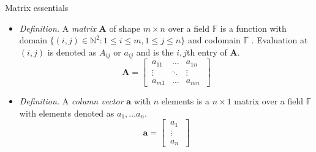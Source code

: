 \documentclass{beamer}
\numberwithin{equation}{section}
\begin{document}
\begin{frame}{Matrix essentials}
    \begin{itemize}
        \item
        \textit{Definition.} A \textit{matrix} $ \mathbf{A} $ of shape
        $ m \times n $ over a field\footnotemark{} $ \mathbb{F} $ is a function with domain $ \{(i, j) \in \mathbb{N}^2
        : 1 \le i \le m, 1 \le j \le n\} $ and codomain $ \mathbb{F} $
        \cite{jacob_linalg}. Evaluation at $ (i, j) $ is denoted as $ A_{ij} $
        or $ a_{ij} $ and is the $ i, j $th entry of $ \mathbf{A} $.
        \begin{equation*}
            \mathbf{A} = \begin{bmatrix}
                \ a_{11} & \ldots & a_{1n} \ \\
                \ \vdots & \ddots & \vdots \ \\
                \ a_{m1} & \ldots & a_{mn} \
            \end{bmatrix}
        \end{equation*}

        \item
        \textit{Definition.} A \textit{column vector} $ \mathbf{a} $ with
        $ n $ elements is a $ n \times 1 $ matrix over a field $ \mathbb{F} $
        with elements denoted as $ a_1, \ldots a_n $.
        \begin{equation*}
            \mathbf{a} = \begin{bmatrix}
                \ a_1 \ \\ \ \vdots \ \\ \ a_n \
            \end{bmatrix}
        \end{equation*}
    \end{itemize}
\end{frame}
\end{document}
